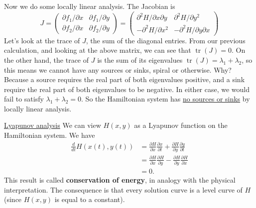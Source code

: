 \documentclass[11pt, letterpaper, oneside]{article}     %
\numberwithin{equation}{subsection}
\theoremstyle{definition}
\numberwithin{theorem}{section}
\theoremstyle{remark}
\DeclareMathOperator{\tr}{tr}
\begin{document}
\begin{enumerate}
  Now we do some locally linear analysis. The Jacobian is
  \begin{equation}
    J =
    \begin{pmatrix}
      \partial f_1/\partial x & \partial f_1/\partial y\\
      \partial f_2/\partial x & \partial f_2/\partial y
    \end{pmatrix}
    =
    \begin{pmatrix}
      \partial^2H/\partial x\partial y & \partial^2H/\partial y^2\\
      -\partial^2H/\partial x^2 & -\partial^2H/\partial y\partial x
    \end{pmatrix}
  \end{equation}
  Let's look at the trace of $J$, the sum of the diagonal entries. From our previous calculation, and looking at the above matrix, we can see that $\tr(J) = 0$. On the other hand, the trace of $J$ is the sum of its eigenvalues $\tr(J) = \lambda_1 + \lambda_2$, so this means we cannot have any sources or sinks, spiral or otherwise. Why? Because a source requires the real part of both eigenvalues positive, and a sink require the real part of both eigenvalues to be negative. In either case, we would fail to satisfy $\lambda_1 + \lambda_2 = 0$. So the Hamiltonian system has \underline{no sources or sinks} by locally linear analysis.

  \underline{Lyapunov analysis} We can view $H(x,y)$ as a Lyapunov function on the Hamiltonian system. We have
  \begin{equation}
    \begin{split}
      \frac{d}{dt}H(x(t),y(t)) &= \frac{\partial H}{\partial x}\frac{\partial x}{\partial t} + \frac{\partial H}{\partial y}\frac{\partial y}{\partial t}\\
      &= \frac{\partial H}{\partial x}\frac{\partial H}{\partial y} - \frac{\partial H}{\partial y}\frac{\partial H}{\partial x}\\
      &= 0.
    \end{split}
  \end{equation}
  This result is called \textbf{conservation of energy}, in analogy with the physical interpretation. The consequence is that every solution curve is a level curve of $H$ (since $H(x,y)$ is equal to a constant).


\end{enumerate}
\end{document}

